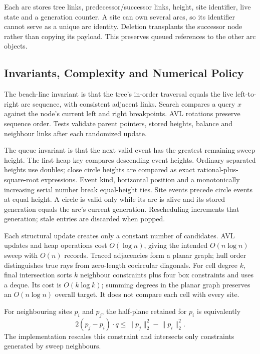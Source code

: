 Each arc stores tree links, predecessor/successor links, height, site identifier, live state and a generation counter. A site can own several arcs, so its identifier cannot serve as a unique arc identity. Deletion transplants the successor node rather than copying its payload. This preserves queued references to the other arc objects.

\subsection{Invariants, Complexity and Numerical Policy}

The beach-line invariant is that the tree's in-order traversal equals the live left-to-right arc sequence, with consistent adjacent links. Search compares a query \(x\) against the node's current left and right breakpoints. AVL rotations preserve sequence order. Tests validate parent pointers, stored heights, balance and neighbour links after each randomized update.

The queue invariant is that the next valid event has the greatest remaining sweep height. The first heap key compares descending event heights. Ordinary separated heights use doubles; close circle heights are compared as exact rational-plus-square-root expressions. Event kind, horizontal position and a monotonically increasing serial number break equal-height ties. Site events precede circle events at equal height. A circle is valid only while its arc is alive and its stored generation equals the arc's current generation. Rescheduling increments that generation; stale entries are discarded when popped.

Each structural update creates only a constant number of candidates. AVL updates and heap operations cost $O(\log n)$, giving the intended $O(n \log n)$ sweep with $O(n)$ records. Traced adjacencies form a planar graph; hull order distinguishes true rays from zero-length cocircular diagonals. For cell degree \(k\), final intersection sorts \(k\) neighbour constraints plus four box constraints and uses a deque. Its cost is $O(k \log k)$; summing degrees in the planar graph preserves an $O(n \log n)$ overall target. It does not compare each cell with every site.

For neighbouring sites \(p_i\) and \(p_j\), the half-plane retained for \(p_i\) is equivalently
\begin{equation}
  2(p_j-p_i)\cdot q
  \leq \lVert p_j\rVert_2^2-\lVert p_i\rVert_2^2.
  \label{eq:halfplane}
\end{equation}
The implementation rescales this constraint and intersects only constraints generated by sweep neighbours.

